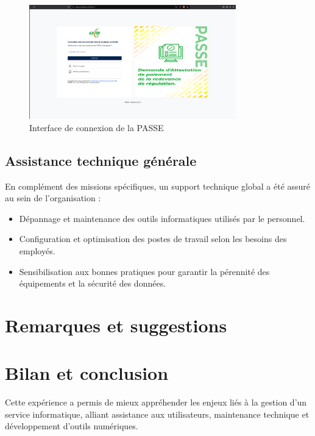 \begin{figure}[H]
    \centering
    \includegraphics[width=0.8\textwidth]{images/passe/login.png}
    \caption{Interface de connexion de la \ac{PASSE}}
    \label{fig:interface-login_pass}
\end{figure}








\subsection{Assistance technique générale}
En complément des missions spécifiques, un support technique global a été assuré au sein de l’organisation :
\begin{itemize}
    \item Dépannage et maintenance des outils informatiques utilisés par le personnel.
    \item Configuration et optimisation des postes de travail selon les besoins des employés.
    \item Sensibilisation aux bonnes pratiques pour garantir la pérennité des équipements et la sécurité des données.
\end{itemize}
\section{Remarques et suggestions}
\section{Bilan et conclusion}
Cette expérience a permis de mieux appréhender les enjeux liés à la gestion d’un service informatique, alliant assistance aux utilisateurs, maintenance technique et développement d’outils numériques.

\clearpage
